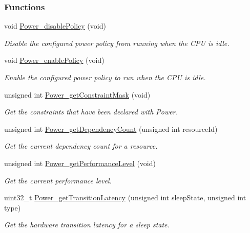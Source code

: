 \subsubsection*{Functions}
\begin{DoxyCompactItemize}
\item 
void \hyperlink{_power_8h_ab0cdc171229c9f0d075c993f2b06ced0}{Power\+\_\+disable\+Policy} (void)
\begin{DoxyCompactList}\small\item\em Disable the configured power policy from running when the C\+P\+U is idle. \end{DoxyCompactList}\item 
void \hyperlink{_power_8h_ae8d6092a8fb35b6db52a69a35fcc327f}{Power\+\_\+enable\+Policy} (void)
\begin{DoxyCompactList}\small\item\em Enable the configured power policy to run when the C\+P\+U is idle. \end{DoxyCompactList}\item 
unsigned int \hyperlink{_power_8h_ac5382aa1050fdf893b55d14041ca0b09}{Power\+\_\+get\+Constraint\+Mask} (void)
\begin{DoxyCompactList}\small\item\em Get the constraints that have been declared with Power. \end{DoxyCompactList}\item 
unsigned int \hyperlink{_power_8h_aee0ed212807eebbed776dbbde19b9567}{Power\+\_\+get\+Dependency\+Count} (unsigned int resource\+Id)
\begin{DoxyCompactList}\small\item\em Get the current dependency count for a resource. \end{DoxyCompactList}\item 
unsigned int \hyperlink{_power_8h_a992dabafbcd2ed75308dd3e166d9e658}{Power\+\_\+get\+Performance\+Level} (void)
\begin{DoxyCompactList}\small\item\em Get the current performance level. \end{DoxyCompactList}\item 
uint32\+\_\+t \hyperlink{_power_8h_a46c52f4c1e6801fdce3d5307257bf2a6}{Power\+\_\+get\+Transition\+Latency} (unsigned int sleep\+State, unsigned int type)
\begin{DoxyCompactList}\small\item\em Get the hardware transition latency for a sleep state. \end{DoxyCompactList}\item 

\end{DoxyCompactItemize}
